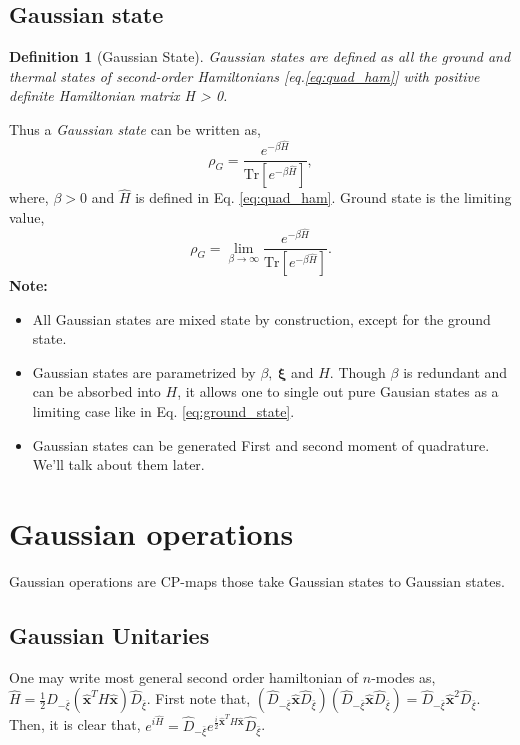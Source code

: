 \documentclass[english,10pt,a4paper]{article}
\newtheorem{definition}{Definition}
\newcommand{\xx}{\hat{\textbf{x}}}
\newcommand{\dd}[1]{\hat{D}_{#1}}
\newcommand{\half}{\frac{1}{2}}
\newcommand{\tr}[1]{\text{Tr}\left[{#1}\right]}
\begin{document}
	\subsection{Gaussian state}
	\begin{definition}[Gaussian State]
		Gaussian states are defined as all the ground and thermal states of second-order Hamiltonians [eq.\ref{eq:quad_ham}] with positive definite Hamiltonian matrix H > 0.
	\end{definition}
	Thus a \textit{Gaussian state} can be written as,
	\begin{equation}
		\label{eq:gaussian_state}
		\rho_G = \frac{e^{-\beta \hat{H}}}{\tr{e^{-\beta \hat{H}}}},
	\end{equation}
	where, $\beta >0$ and $\hat{H}$ is defined in Eq. \ref{eq:quad_ham}. Ground state is the limiting value,
	\begin{equation}
		\label{eq:ground_state}
		\rho_G = \lim_{\beta\to \infty} \frac{e^{-\beta \hat{H}}}{\tr{e^{-\beta \hat{H}}}}.
	\end{equation}
	\textbf{Note:}
	\begin{itemize}
		\item All Gaussian states are mixed state by construction, except for the ground state.
		\item Gaussian states are parametrized by $\beta,\ \mathbf{\xi}$ and $H$. Though $\beta$ is redundant and can be absorbed into $H$, it allows one to single out pure Gausian states as a limiting case like in Eq. \ref{eq:ground_state}. 
		\item Gaussian states can be generated First and second moment of quadrature. We'll talk about them later.
	\end{itemize}
	
	\section{Gaussian operations}
	Gaussian operations are CP-maps those take Gaussian states to Gaussian states.
	\subsection{Gaussian Unitaries}
	One may write most general second order hamiltonian of $n$-modes as, $\hat{H}=\half \dd{-\bar{\xi}} (\xx^T H \xx )\dd{\bar{\xi}} $.
	First note that, $(\dd{-\bar{\xi}} \xx \dd{\bar{\xi}}) (\dd{-\bar{\xi}} \xx \dd{\bar{\xi}}) = \dd{-\bar{\xi}} \xx^2 \dd{\bar{\xi}}$. Then, 
	it is clear that, $ e^{i\hat{H}} =  \dd{-\bar{\xi}} e^{\frac{i}{2}\xx^T H \xx } \dd{\bar{\xi}}$.
	
\end{document}
